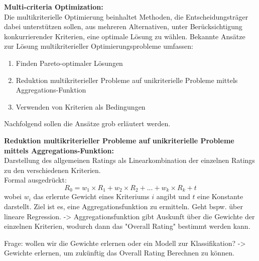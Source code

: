 \textbf{Multi-criteria Optimization:}\\
Die multikriterielle Optimierung beinhaltet Methoden, die Entscheidungsträger dabei unterstützen sollen, aus mehreren Alternativen, unter Berücksichtigung konkurrierender Kriterien, eine optimale Lösung zu wählen. %
Bekannte Ansätze zur Lösung multikriterieller Optimierungsprobleme umfassen:
\begin{enumerate} %
    \item Finden Pareto-optimaler Lösungen
    \item Reduktion multikriterieller Probleme auf unikriterielle Probleme mittels Aggregations-Funktion
    \item Verwenden von Kriterien als Bedingungen
\end{enumerate}
Nachfolgend sollen die Ansätze grob erläutert werden.

\textbf{Reduktion multikriterieller Probleme auf unikriterielle Probleme mittels Aggregations-Funktion:}\\
Darstellung des allgemeinen Ratings als Linearkombination der einzelnen Ratings zu den verschiedenen Kriterien.\\
Formal ausgedrückt:
\begin{equation}
    R_{0} = w_{1} \times R_{1} + w_{2} \times R_{2} + ... + w_{k} \times R_{k} + t
\end{equation}
wobei $w_{i}$ das erlernte Gewicht eines Kriteriums $i$ angibt und $t$ eine Konstante darstellt.
Ziel ist es, eine Aggregationsfunktion zu ermitteln. Geht bspw. über lineare Regression. -> Aggregationsfunktion gibt Auskunft über die Gewichte der einzelnen Kriterien, wodurch dann das "Overall Rating" bestimmt werden kann.

Frage: wollen wir die Gewichte erlernen oder ein Modell zur Klassifikation? -> Gewichte erlernen, um zukünftig das Overall Rating Berechnen zu können.

